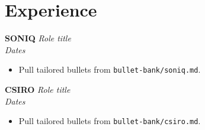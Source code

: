 \section*{Experience}

\textbf{SONIQ} \hfill \textit{Role title} \\
\textit{Dates}
\begin{itemize}
  \item Pull tailored bullets from \texttt{bullet-bank/soniq.md}.
\end{itemize}

\textbf{CSIRO} \hfill \textit{Role title} \\
\textit{Dates}
\begin{itemize}
  \item Pull tailored bullets from \texttt{bullet-bank/csiro.md}.
\end{itemize}
